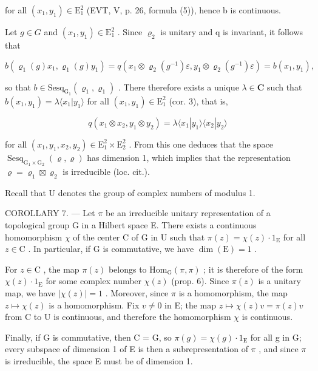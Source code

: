 for all \((x_{1},y_{1})\in\mathrm{E}_{1}^{2}\) (EVT, V, p. 26, formula (5)), hence b is continuous.

Let \(g \in G\) and \((x_{1}, y_{1}) \in \mathrm{E}_{1}^{2}\) . Since \(\varrho_{2}\) is unitary and q is invariant, it follows that

\[
b \left(\varrho_ {1} (g) x _ {1}, \varrho_ {1} (g) y _ {1}\right) = q \left(x _ {1} \otimes \varrho_ {2} \left(g ^ {- 1}\right) \varepsilon , y _ {1} \otimes \varrho_ {2} \left(g ^ {- 1}\right) \varepsilon\right) = b \left(x _ {1}, y _ {1}\right),
\]

so that \(b \in \mathrm{Sesq}_{\mathrm{G}_1}(\varrho_1, \varrho_1)\) . There therefore exists a unique \(\lambda \in \mathbf{C}\) such that \(b(x_1, y_1) = \lambda \langle x_1 | y_1 \rangle\) for all \((x_1, y_1) \in \mathrm{E}_1^2\) (cor. 3), that is,

\[
q (x _ {1} \otimes x _ {2}, y _ {1} \otimes y _ {2}) = \lambda \langle x _ {1} | y _ {1} \rangle \langle x _ {2} | y _ {2} \rangle
\]

for all \((x_{1},y_{1},x_{2},y_{2})\in\mathrm{E}_{1}^{2}\times\mathrm{E}_{2}^{2}\) . From this one deduces that the space \(\operatorname{Sesq}_{\mathrm{G}_{1}\times\mathrm{G}_{2}}(\varrho,\varrho)\) has dimension 1, which implies that the representation \(\varrho=\varrho_{1}\boxtimes\varrho_{2}\) is irreducible (loc. cit.).

Recall that U denotes the group of complex numbers of modulus 1.

COROLLARY 7. --- Let \(\pi\) be an irreducible unitary representation of a topological group G in a Hilbert space E. There exists a continuous homomorphism \(\chi\) of the center C of G in U such that \(\pi(z) = \chi(z) \cdot 1_{\mathrm{E}}\) for all \(z \in \mathrm{C}\) . In particular, if G is commutative, we have \(\dim(\mathrm{E}) = 1\) .

For \(z \in \mathrm{C}\) , the map \(\pi(z)\) belongs to \(\mathrm{Hom}_{\mathrm{G}}(\pi, \pi)\) ; it is therefore of the form \(\chi(z) \cdot 1_{\mathrm{E}}\) for some complex number \(\chi(z)\) (prop. 6). Since \(\pi(z)\) is a unitary map, we have \(|\chi(z)| = 1\) . Moreover, since \(\pi\) is a homomorphism, the map \(z \mapsto \chi(z)\) is a homomorphism. Fix \(v \neq 0\) in E; the map \(z \mapsto \chi(z)v = \pi(z)v\) from C to U is continuous, and therefore the homomorphism \(\chi\) is continuous.

Finally, if G is commutative, then C = G, so \(\pi(g) = \chi(g) \cdot 1_{\mathrm{E}}\) for all g in G; every subspace of dimension 1 of E is then a subrepresentation of \(\pi\) , and since \(\pi\) is irreducible, the space E must be of dimension 1.

